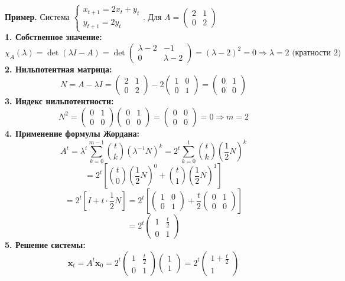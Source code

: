 \textbf{Пример.} Система $\begin{cases} x_{t+1} = 2x_t + y_t \\ y_{t+1} = 2y_t \end{cases}$. Для $A = \begin{pmatrix} 2 & 1 \\ 0 & 2 \end{pmatrix}$\\
\textbf{1. Собственное значение:}
$$\chi_A(\lambda) = \det(\lambda I - A) = \det\begin{pmatrix} \lambda-2 & -1 \\ 0 & \lambda-2 \end{pmatrix} = (\lambda-2)^2 = 0 \Rightarrow \lambda = 2 \text{ (кратности 2)}$$
\textbf{2. Нильпотентная матрица:}
$$N = A - \lambda I = \begin{pmatrix} 2 & 1 \\ 0 & 2 \end{pmatrix} - 2\begin{pmatrix} 1 & 0 \\ 0 & 1 \end{pmatrix} = \begin{pmatrix} 0 & 1 \\ 0 & 0 \end{pmatrix}$$
\textbf{3. Индекс нильпотентности:}
$$N^2 = \begin{pmatrix} 0 & 1 \\ 0 & 0 \end{pmatrix}\begin{pmatrix} 0 & 1 \\ 0 & 0 \end{pmatrix} = \begin{pmatrix} 0 & 0 \\ 0 & 0 \end{pmatrix} = 0 \Rightarrow m = 2$$
\textbf{4. Применение формулы Жордана:}
$$A^t = \lambda^t \sum_{k=0}^{m-1} \binom{t}{k} (\lambda^{-1}N)^k = 2^t \sum_{k=0}^{1} \binom{t}{k} \left(\frac{1}{2}N\right)^k$$
$$= 2^t \left[ \binom{t}{0} \left(\frac{1}{2}N\right)^0 + \binom{t}{1} \left(\frac{1}{2}N\right)^1 \right]$$
$$= 2^t \left[ I + t \cdot \frac{1}{2}N \right] = 2^t \left[ \begin{pmatrix} 1 & 0 \\ 0 & 1 \end{pmatrix} + \frac{t}{2}\begin{pmatrix} 0 & 1 \\ 0 & 0 \end{pmatrix} \right]$$
$$= 2^t \begin{pmatrix} 1 & \frac{t}{2} \\ 0 & 1 \end{pmatrix}$$
\textbf{5. Решение системы:}
$$\mathbf{x}_t = A^t\mathbf{x}_0 = 2^t \begin{pmatrix} 1 & \frac{t}{2} \\ 0 & 1 \end{pmatrix}\begin{pmatrix} 1 \\ 1 \end{pmatrix} = 2^t \begin{pmatrix} 1 + \frac{t}{2} \\ 1 \end{pmatrix}$$

